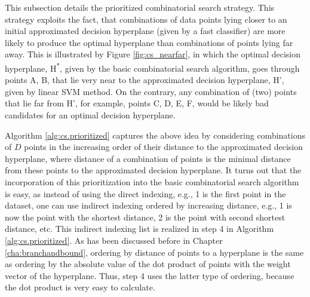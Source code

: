 This subsection details the prioritized combinatorial search strategy. This strategy exploits the fact, that combinations of data points lying closer to an initial approximated decision hyperplane (given by a fast classifier) are more likely to produce the optimal hyperplane than combinations of points lying far away. This is illustrated by Figure \ref{fig:cs_nearfar}, in which the optimal decision hyperplane, H\textsuperscript{*}, given by the basic combinatorial search algorithm, goes through points A, B, that lie very near to the approximated decision hyperplane, H', given by linear SVM method. On the contrary, any combination of (two) points that lie far from H', for example, points C, D, E, F, would be likely bad candidates for an optimal decision hyperplane. 

Algorithm \ref{alg:cs.prioritized} captures the above idea by considering combinations of $D$ points in the increasing order of their distance to the approximated decision hyperplane, where distance of a combination of points is the minimal distance from these points to the approximated decision hyperplane. It turns out that the incorporation of this prioritization into the basic combinatorial search algorithm is easy, as instead of using the direct indexing, e.g., 1 is the first point in the dataset, one can use indirect indexing ordered by increasing distance, e.g., 1 is now the point with the shortest distance, 2 is the point with second shortest distance, etc. This indirect indexing list is realized in step 4 in Algorithm \ref{alg:cs.prioritized}. As has been discussed before in Chapter \ref{cha:branchandbound}, ordering by distance of points to a hyperplane is the same as ordering by the absolute value of the dot product of points with the weight vector of the hyperplane. Thus, step 4 uses the latter type of ordering, because the dot product is very easy to calculate. 

